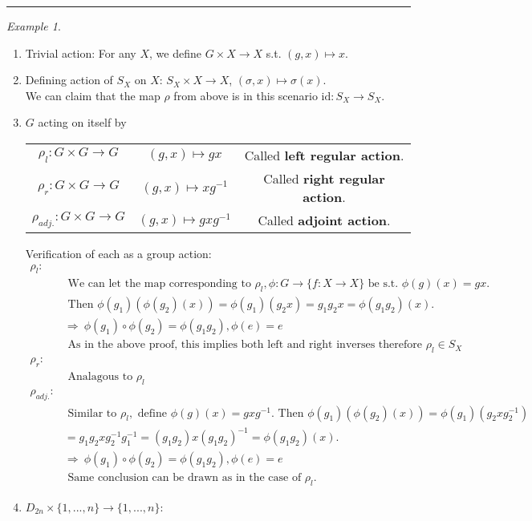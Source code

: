 \documentclass{article}
\theoremstyle{definition}
\theoremstyle{remark}
\newtheorem*{example}{Example}
\begin{document}
\hrule
\vspace{2mm}
\begin{example}~
\begin{enumerate}
\item Trivial action: For any $X$, we define $G\times X\rightarrow X$ s.t. $(g,x)\mapsto x$.
\item Defining action of $S_X$ on $X$: $S_X\times X\rightarrow X$, $(\sigma,x)\mapsto\sigma(x)$.\\ We can claim that the map $\rho$ from above is in this scenario $\mathrm{id}:S_X\rightarrow S_X$.
\item $G$ acting on itself by \\
\begin{tabular}{ccc}
$\rho_l : G\times G\rightarrow G$&$(g,x)\mapsto gx$& Called \textbf{left regular action}.\\
$\rho_r:G\times G\rightarrow G$&$(g,x)\mapsto xg^{-1}$& Called \textbf{right regular action}.\\
$\rho_{adj.}:G\times G\rightarrow G$&$(g,x)\mapsto gxg^{-1}$& Called \textbf{adjoint action}.
\end{tabular}
Verification of each as a group action:
\begin{align*}
\rho_l:& \\
		&\text{ We can let the map corresponding to }\rho_l,\phi:G\rightarrow\lbrace f:X\rightarrow X\rbrace \text{ be s.t. }\phi(g)(x)=gx.\\
		&\text{ Then } \phi(g_1)(\phi(g_2)(x))=\phi(g_1)(g_2x)=g_1g_2x=\phi(g_1g_2)(x).\\
		&\Rightarrow ~\phi(g_1)\circ\phi(g_2)=\phi(g_1g_2), \phi(e)=e\\
		&\text{ As in the above proof, this implies both left and right inverses therefore }\rho_l\in S_X\\
\rho_r:&\\
		&\text{ Analagous to }\rho_l\\
\rho_{adj.}:&\\
		& \text{ Similar to }\rho_l, \text{ define } \phi(g)(x)=gxg^{-1}. \text{ Then } \phi(g_1)(\phi(g_2)(x))=\phi(g_1)(g_2xg_2^{-1})\\&=g_1g_2xg_2^{-1}g_1^{-1}=(g_1g_2)x(g_1g_2)^{-1}=\phi(g_1g_2)(x).\\
		&\Rightarrow ~\phi(g_1)\circ\phi(g_2)=\phi(g_1g_2), \phi(e)=e\\
		& \text{ Same conclusion can be drawn as in the case of } \rho_l.
\end{align*}
\item $D_{2n}\times\lbrace1,...,n\rbrace\rightarrow\lbrace1,...,n\rbrace:$

\end{enumerate}
\end{example}
\end{document}
